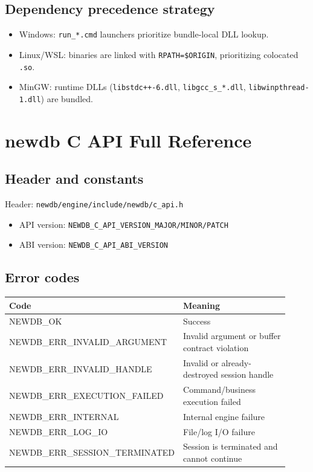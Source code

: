 \documentclass[11pt,a4paper]{article}
\begin{document}
\subsection{Dependency precedence strategy}
\begin{itemize}
  \item Windows: \texttt{run\_*.cmd} launchers prioritize bundle-local DLL lookup.
  \item Linux/WSL: binaries are linked with \texttt{RPATH=\$ORIGIN}, prioritizing colocated \texttt{.so}.
  \item MinGW: runtime DLLs (\texttt{libstdc++-6.dll}, \texttt{libgcc\_s\_*.dll}, \texttt{libwinpthread-1.dll}) are bundled.
\end{itemize}

\section{newdb C API Full Reference}
\subsection{Header and constants}
Header: \texttt{newdb/engine/include/newdb/c\_api.h}
\begin{itemize}
  \item API version: \texttt{NEWDB\_C\_API\_VERSION\_MAJOR/MINOR/PATCH}
  \item ABI version: \texttt{NEWDB\_C\_API\_ABI\_VERSION}
\end{itemize}

\subsection{Error codes}
\begin{longtable}{>{\ttfamily}p{0.34\linewidth}p{0.58\linewidth}}
\toprule
Code & Meaning \\
\midrule
NEWDB\_OK & Success \\
NEWDB\_ERR\_INVALID\_ARGUMENT & Invalid argument or buffer contract violation \\
NEWDB\_ERR\_INVALID\_HANDLE & Invalid or already-destroyed session handle \\
NEWDB\_ERR\_EXECUTION\_FAILED & Command/business execution failed \\
NEWDB\_ERR\_INTERNAL & Internal engine failure \\
NEWDB\_ERR\_LOG\_IO & File/log I/O failure \\
NEWDB\_ERR\_SESSION\_TERMINATED & Session is terminated and cannot continue \\
\bottomrule
\end{longtable}
\end{document}
